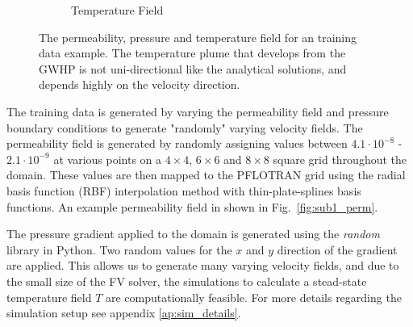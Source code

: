 \documentclass{article} %
\begin{document}
\begin{figure}[!htb]
\begin{subfigure}{.33\textwidth}
  \caption{Temperature Field}
  \label{fig:sub1_temp}
\end{subfigure}%
\caption{The permeability, pressure and temperature field for an training data example. The temperature plume that develops from the GWHP is not uni-directional like the analytical solutions, and depends highly on the velocity direction.}
\label{fig:data_example}
\end{figure}




The training data is generated by varying the permeability field and pressure boundary conditions to generate "randomly" varying velocity fields.
The permeability field is generated by randomly assigning values between $4.1 \cdot 10^{-8}$ - $2.1 \cdot 10^{-9}$ at various points on a $4 \times 4$, $6 \times 6$ and $8 \times 8$ square grid throughout the domain. These values are then mapped to the PFLOTRAN grid using the radial basis function (RBF) interpolation method with thin-plate-splines basis functions.
An example permeability field in shown in Fig.~\ref{fig:sub1_perm}.

The pressure gradient applied to the domain is generated using the \textit{random} library in Python. Two random values for the $x$ and $y$ direction of the gradient are applied.
This allows us to generate many varying velocity fields, and due to the small size of the FV solver, the simulations to calculate a stead-state temperature field $T$ are computationally feasible.
For more details regarding the simulation setup see appendix \ref{ap:sim_details}.

\end{document}
